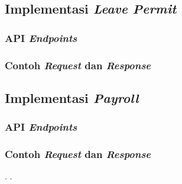 \subsection{Implementasi \textit{Leave Permit}}
\subsubsection{API \textit{Endpoints}}
\subsubsection{Contoh \textit{Request} dan \textit{Response}}

\subsection{Implementasi \textit{Payroll}}
\subsubsection{API \textit{Endpoints}}
\subsubsection{Contoh \textit{Request} dan \textit{Response}}



\clearpage
.
\clearpage
.
\clearpage



